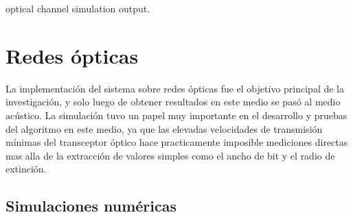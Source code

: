 optical channel simulation output. 


\section{Redes ópticas}
La implementación del sistema sobre redes ópticas fue el objetivo principal de la investigación, y solo luego de obtener resultados en este medio se pasó al medio acústico.
La simulación tuvo un papel muy importante en el desarrollo y pruebas del algoritmo en este medio, ya que las elevadas velocidades de transmisión mínimas del transceptor óptico hace practicamente imposible mediciones directas mas alla de la extracción de valores simples como el ancho de bit y el radio de extinción.
\subsection{Simulaciones numéricas}

